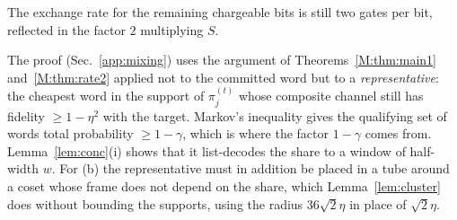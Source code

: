 \documentclass[aps,prx,twocolumn,superscriptaddress,nofootinbib,longbibliography]{revtex4-2}
\theoremstyle{plain}
\theoremstyle{definition}
\theoremstyle{remark}
\begin{document}
The exchange rate for the remaining chargeable bits is still two gates per bit, reflected in the factor $2$ multiplying $S$. 

The proof (Sec.~\ref{app:mixing}) uses the argument of Theorems~\ref{M:thm:main1} and~\ref{M:thm:rate2} applied not to the committed word but to a \emph{representative}: the cheapest word in the support of $\pi^{(t)}_j$ whose composite channel still has fidelity $\ge1-\eta^2$ with the target. Markov's inequality gives the qualifying set of words total probability $\ge1-\gamma$, which is where the factor $1-\gamma$ comes from. Lemma~\ref{lem:conc}(i) shows that it list-decodes the share to a window of half-width $w$. For (b) the representative must in addition be placed in a tube around a coset whose frame does not depend on the share, which Lemma~\ref{lem:cluster} does without bounding the supports, using the radius $36\sqrt2\eta$ in place of $\sqrt2\eta$.
\end{document}
